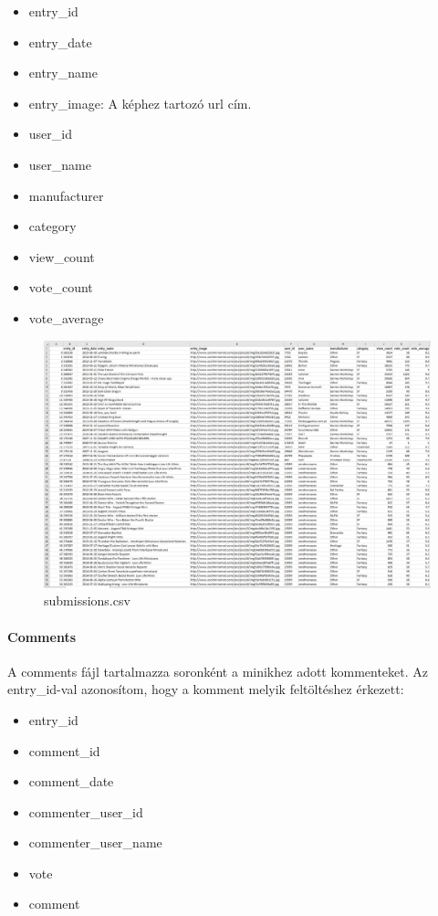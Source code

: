 \documentclass[14pt,a4paper]{article}
\begin{document}
\begin{itemize}
\item entry\_id
\item entry\_date
\item entry\_name
\item entry\_image: A képhez tartozó url cím.
\item user\_id
\item user\_name
\item manufacturer
\item category
\item view\_count
\item vote\_count
\item vote\_average
\end{itemize}

\begin{figure}[H]
\centering
\includegraphics[width=1.0\columnwidth]{pics/csv_submissions.png}
\caption{submissions.csv}
\end{figure}

\paragraph{Comments}

A comments fájl tartalmazza soronként a minikhez adott kommenteket. Az entry\_id-val azonosítom, hogy a komment
melyik feltöltéshez érkezett:

\begin{itemize}
\item entry\_id
\item comment\_id
\item comment\_date
\item commenter\_user\_id
\item commenter\_user\_name
\item vote
\item comment
\end{itemize}
\end{document}
